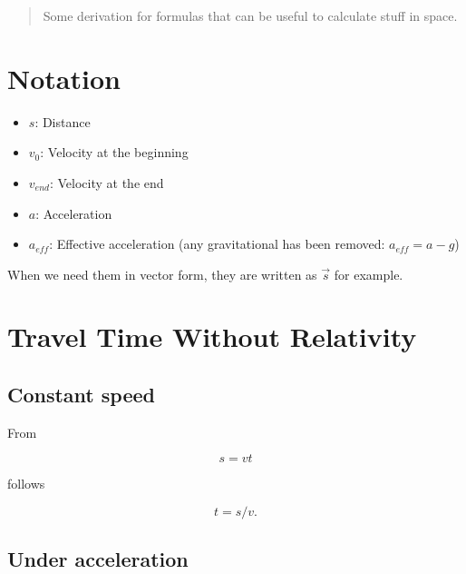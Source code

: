 \documentclass[10pt]{article}
\begin{document}
	\maketitle
	\newpage
	
	\tableofcontents
	\newpage
	
	\begin{abstract}
		Some derivation for formulas that can be useful to calculate stuff in space.
	\end{abstract}
	
	\section{Notation}
	
	\begin{itemize}
		\item $s$: Distance
		\item $v_0$: Velocity at the beginning
		\item $v_{end}$: Velocity at the end
		\item $a$: Acceleration
		\item $a_{eff}$: Effective acceleration (any gravitational has been removed: $a_{eff} = a - g$)
	\end{itemize}
	
	When we need them in vector form, they are written as $\vec{s}$ for example.
	
	\section{Travel Time Without Relativity}\label{TravelTime}
	
	\subsection{Constant speed}
	
	From 
	
	\begin{equation}
		s = vt
	\end{equation}
	
	follows

	\begin{equation}
		t = s/v.
	\end{equation}
	
	\subsection{Under acceleration}
	
\end{document}
